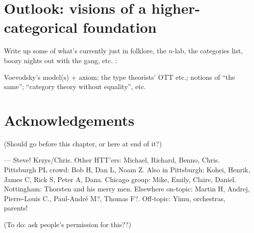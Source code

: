 \section{Outlook: visions of a higher-categorical foundation}

\para Write up some of what's currently just in folklore, the $n$-lab, the categories list, boozy nights out with the gang, etc. :

Voevodsky's model(s) + axiom; the type theorists' OTT etc.; notions of ``the same''; ``category theory without equality'', etc.

\section{Acknowledgements}

(Should go before this chapter, or here at end of it?)

--- Steve!  Krzys/Chris.  Other HTT'ers: Michael, Richard, Benno, Chris.  Pittsburgh PL crowd: Bob H, Dan L, Noam Z.  Also in Pittsburgh: Kohei, Henrik, James C, Rick S, Peter A, Dana.  Chicago group: Mike, Emily, Claire, Daniel.  Nottingham: Thorsten and his merry men.  Elsewhere on-topic: Martin H, Andrej, Pierre-Louis C., Paul-André M?, Thomas F?.  Off-topic: Yimu, orchestras, parents!

(To do: ask people's permission for this??)
